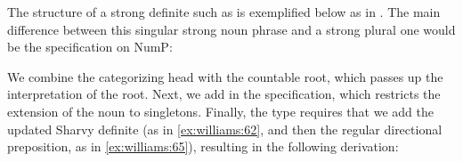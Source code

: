\documentclass[output=paper,
modfonts
]{langscibook}
\begin{document}
The structure of a strong definite such as   is exemplified below as in . The main difference between this singular strong noun phrase and a strong plural one would be the specification on NumP:

\begin{exe}
\end{exe}
We combine the categorizing head with the countable root, which passes up the interpretation of the root. Next, we add in the  specification, which restricts the extension of the noun to singletons. Finally, the type requires that we add the updated Sharvy definite (as in \ref{ex:williams:62}, and then the regular directional preposition, as in \ref{ex:williams:65}), resulting in the following derivation:
\end{document}
